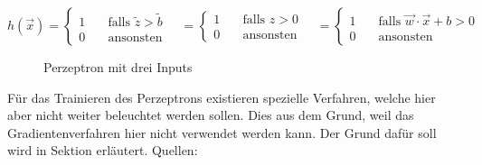 \begin{equation}\label{eq:perzeptron_1}
  h(\vec{x}) =
  \begin{cases}
    1 & \quad \text{falls } \tilde{z} > \tilde{b}\\
    0 & \quad \text{ansonsten}
  \end{cases}
  \quad =
  \begin{cases}
    1 & \quad \text{falls } z > 0\\
    0 & \quad \text{ansonsten}
  \end{cases}
  \quad =
  \begin{cases}
    1 & \quad\text{falls } \vec{w} \cdot \vec{x} + b > 0\\
    0 & \quad\text{ansonsten}
  \end{cases}
\end{equation}
\para{}
\begin{figure}[h!]
  \centering
  \caption{Perzeptron mit drei Inputs}
  \label{fi:perzeptron}
\end{figure}
\para{}
Für das Trainieren des Perzeptrons existieren spezielle Verfahren, welche hier
aber nicht weiter beleuchtet werden sollen. Dies aus dem Grund, weil das
Gradientenverfahren hier nicht verwendet werden kann.
Der Grund dafür soll wird in Sektion  erläutert.
\para{}
Quellen: \cite{wiki:perzeptron} \cite{Nielsen} \cite{book:hands-on}

